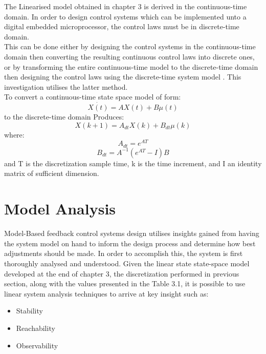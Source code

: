 \documentclass[12pt,a4paper,twoside]{report}
\begin{document}
			The Linearised model obtained in chapter 3 is derived in the continuous-time domain. In order to design control systems which can be implemented unto a digital embedded microprocessor, the control laws must be in discrete-time domain.
			\\
			This can be done either by designing the control systems in the continuous-time domain then converting the resulting continuous control laws into discrete ones, or by transforming the entire continuous-time model to the discrete-time domain then designing the control laws using the discrete-time system model \cite{18}. This investigation utilises the latter method.
			\\
			To convert a continuous-time state space model of form:
			\[
				\dot{X(t)} = AX(t) + B\mu(t)
			\]
			to the discrete-time domain Produces:
			\begin{equation}
				X(k+1) = A_{dt}X(k) + B_{dt}\mu(k)
			\end{equation}
			where:
			\begin{equation}
				A_{dt} = e^{AT} 
			\end{equation}
			\begin{equation}
				B_{dt} = A^{-1}(e^{AT} - I)B
			\end{equation}
			\space
			and T is the discretization sample time, k is the time increment, and I an identity matrix of sufficient dimension.
			
		\section{Model Analysis}
			
			Model-Based feedback control systems design utilises insights gained from having the system model on hand to inform the design process and determine how best adjustments should be made. In order to accomplish this, the system is first thoroughly analysed and understood. Given the linear state state-space model developed at the end of chapter 3, the discretization performed in previous section, along with the values presented in the Table 3.1, it is possible to use linear system analysis techniques to arrive at key insight such as:
			
			\begin{itemize}
				\item 
					Stability
				\item 
					Reachability
				\item
					Observability
			\end{itemize}
		
\end{document}
